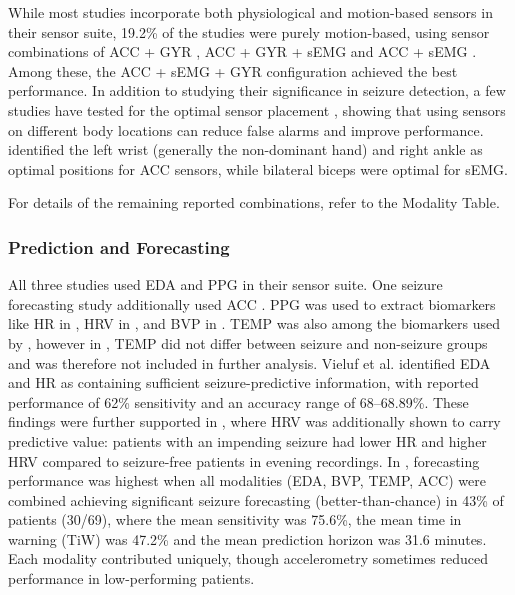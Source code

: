 While most studies incorporate both physiological and motion-based sensors in their sensor suite, 19.2\% of the studies were purely motion-based, using sensor combinations of ACC + GYR \cite{Larsen2024-vn, Dong2022-oo}, ACC + GYR + sEMG \cite{Wang2025-my, Gheryani2017-yg} and ACC + sEMG \cite{Milosevic2016-ee}. Among these, the ACC + sEMG + GYR configuration achieved the best performance. In addition to studying their significance in seizure detection, a few studies have tested for the optimal sensor placement \cite{Milosevic2016-ee, De_Cooman2018-pq}, showing that using sensors on different body locations can reduce false alarms and improve performance. \cite{Milosevic2016-ee} identified the left wrist (generally the non-dominant hand) and right ankle as optimal positions for ACC sensors, while bilateral biceps were optimal for sEMG. 

For details of the remaining reported combinations, refer to the Modality Table.

\subsubsection{Prediction and Forecasting}
All three studies used EDA and PPG in their sensor suite. One seizure forecasting study additionally used ACC \cite{Meisel2020-ii}. PPG was used to extract biomarkers like HR in \cite{Vieluf2023-ta, Vieluf2023-zv}, HRV in \cite{Vieluf2023-zv}, and BVP in \cite{Meisel2020-ii}. TEMP was also among the biomarkers used by \cite{Vieluf2023-zv, Meisel2020-ii}, however in \cite{Vieluf2023-zv}, TEMP did not differ between seizure and non-seizure groups and was therefore not included in further analysis. Vieluf et al. \cite{Vieluf2023-ta, Vieluf2023-zv} identified EDA and HR as containing sufficient seizure-predictive information, with reported performance of 62\% sensitivity and an accuracy range of 68–68.89\%. These findings were further supported in \cite{Vieluf2023-zv}, where HRV was additionally shown to carry predictive value: patients with an impending seizure had lower HR and higher HRV compared to seizure-free patients in evening recordings. In \cite{Meisel2020-ii}, forecasting performance was highest when all modalities (EDA, BVP, TEMP, ACC) were combined achieving significant seizure forecasting (better-than-chance) in 43\% of patients (30/69), where the mean sensitivity was 75.6\%, the mean time in warning (TiW) was 47.2\% and the mean prediction horizon was 31.6 minutes. Each modality contributed uniquely, though accelerometry sometimes reduced performance in low-performing patients.

